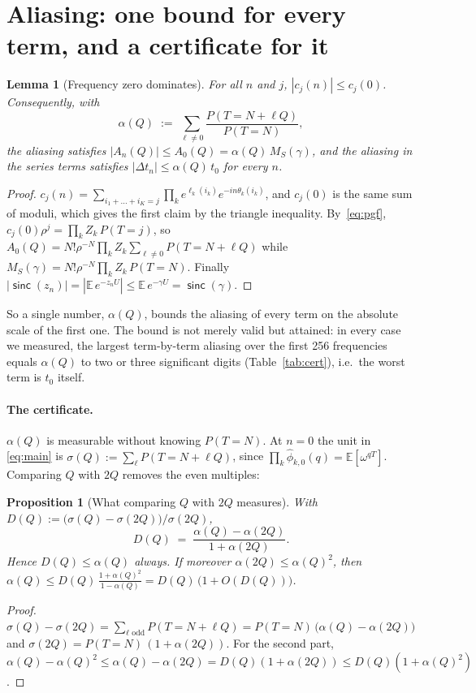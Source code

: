 \documentclass[11pt]{article}
\newtheorem{proposition}{Proposition}
\newtheorem{lemma}{Lemma}
\newcommand{\sinck}{\operatorname{\mathsf{sinc}}}
\begin{document}
\section{Aliasing: one bound for every term, and a certificate for it}
\label{sec:alias}

\begin{lemma}[Frequency zero dominates]
\label{lem:dominate}
For all $n$ and $j$, $|c_j(n)|\le c_j(0)$. Consequently, with
\[
  \alpha(Q)\;:=\;\sum_{\ell\ne0}\frac{P(T=N+\ell Q)}{P(T=N)},
\]
the aliasing satisfies $|A_n(Q)|\le A_0(Q)=\alpha(Q)\,M_S(\gamma)$, and the aliasing in the series
terms satisfies $|\Delta t_n|\le\alpha(Q)\,t_0$ for every $n$.
\end{lemma}
\begin{proof}
$c_j(n)=\sum_{i_1+\dots+i_K=j}\prod_ke^{\ell_k(i_k)}e^{-in\theta_k(i_k)}$, and $c_j(0)$ is the same sum
of moduli, which gives the first claim by the triangle inequality. By~\eqref{eq:pgf},
$c_j(0)\rho^j=\prod_kZ_k\,P(T=j)$, so $A_0(Q)=N!\rho^{-N}\prod_kZ_k\sum_{\ell\ne0}P(T=N+\ell Q)$ while
$M_S(\gamma)=N!\rho^{-N}\prod_kZ_k\,P(T=N)$. Finally
$|\sinck(z_n)|=|\mathbb E\,e^{-z_nU}|\le\mathbb E\,e^{-\gamma U}=\sinck(\gamma)$.
\end{proof}

So a single number, $\alpha(Q)$, bounds the aliasing of every term on the absolute scale of the first
one. The bound is not merely valid but attained: in every case we measured, the largest
term-by-term aliasing over the first 256 frequencies equals $\alpha(Q)$ to two or three significant
digits (Table~\ref{tab:cert}), i.e.\ the worst term is $t_0$ itself.

\paragraph{The certificate.} $\alpha(Q)$ is measurable without knowing $P(T=N)$. At $n=0$ the unit in
\eqref{eq:main} is $\sigma(Q):=\sum_{\ell}P(T=N+\ell Q)$, since
$\prod_k\hat\phi_{k,0}(q)=\mathbb E[\omega^{qT}]$. Comparing $Q$ with $2Q$ removes the even multiples:

\begin{proposition}[What comparing $Q$ with $2Q$ measures]
\label{prop:cert}
With $D(Q):=\big(\sigma(Q)-\sigma(2Q)\big)/\sigma(2Q)$,
\[
  D(Q)\;=\;\frac{\alpha(Q)-\alpha(2Q)}{1+\alpha(2Q)} .
\]
Hence $D(Q)\le\alpha(Q)$ always. If moreover $\alpha(2Q)\le\alpha(Q)^2$, then
$\alpha(Q)\le D(Q)\,\frac{1+\alpha(Q)^2}{1-\alpha(Q)}=D(Q)\,\big(1+O(D(Q))\big)$.
\end{proposition}
\begin{proof}
$\sigma(Q)-\sigma(2Q)=\sum_{\ell\text{ odd}}P(T=N+\ell Q)=P(T=N)\,\big(\alpha(Q)-\alpha(2Q)\big)$ and
$\sigma(2Q)=P(T=N)\,(1+\alpha(2Q))$. For the second part,
$\alpha(Q)-\alpha(Q)^2\le\alpha(Q)-\alpha(2Q)=D(Q)(1+\alpha(2Q))\le D(Q)(1+\alpha(Q)^2)$.
\end{proof}
\end{document}
